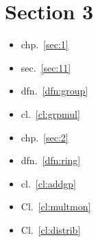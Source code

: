 \hypertarget{section-3}{%
\section{\texorpdfstring{\label{section-3}Section
3}{Section 3}}\label{section-3}}

\begin{itemize}
\item
  chp.~\ref{sec:1}
\item
  sec.~\ref{sec:11}
\item
  dfn.~\ref{dfn:group}
\item
  cl.~\ref{cl:grpmul}
\item
  chp.~\ref{sec:2}
\item
  dfn.~\ref{dfn:ring}
\item
  cl.~\ref{cl:addgp}
\item
  Cl.~\ref{cl:multmon}
\item
  Cl.~\ref{cl:distrib}
\end{itemize}
